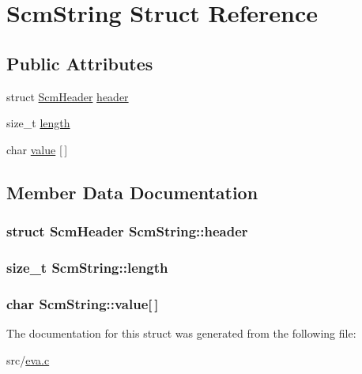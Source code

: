 \hypertarget{struct_scm_string}{\section{Scm\-String Struct Reference}
\label{struct_scm_string}
}
\subsection*{Public Attributes}
\begin{DoxyCompactItemize}
\item 
struct \hyperlink{struct_scm_header}{Scm\-Header} \hyperlink{struct_scm_string_ab9ae6d4c551c5e0f822e0e5b7c27f51c}{header}
\item 
size\-\_\-t \hyperlink{struct_scm_string_a2086b888df130a2ad0abe56371d1aff6}{length}
\item 
char \hyperlink{struct_scm_string_ab63601831e2c17629a03c24b424834ec}{value} \mbox{[}$\,$\mbox{]}
\end{DoxyCompactItemize}


\subsection{Member Data Documentation}
\hypertarget{struct_scm_string_ab9ae6d4c551c5e0f822e0e5b7c27f51c}{
\subsubsection[{header}]{\setlength{\rightskip}{0pt plus 5cm}struct {\bf Scm\-Header} Scm\-String\-::header}}\label{struct_scm_string_ab9ae6d4c551c5e0f822e0e5b7c27f51c}
\hypertarget{struct_scm_string_a2086b888df130a2ad0abe56371d1aff6}{
\subsubsection[{length}]{\setlength{\rightskip}{0pt plus 5cm}size\-\_\-t Scm\-String\-::length}}\label{struct_scm_string_a2086b888df130a2ad0abe56371d1aff6}
\hypertarget{struct_scm_string_ab63601831e2c17629a03c24b424834ec}{
\subsubsection[{value}]{\setlength{\rightskip}{0pt plus 5cm}char Scm\-String\-::value\mbox{[}$\,$\mbox{]}}}\label{struct_scm_string_ab63601831e2c17629a03c24b424834ec}


The documentation for this struct was generated from the following file\-:\begin{DoxyCompactItemize}
\item 
src/\hyperlink{eva_8c}{eva.\-c}\end{DoxyCompactItemize}
